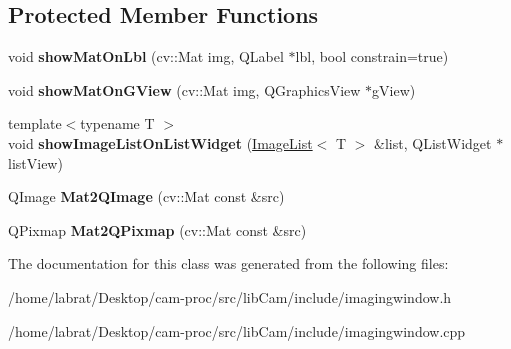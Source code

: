 \subsection*{Protected Member Functions}
\begin{DoxyCompactItemize}
\item 
void {\bfseries show\+Mat\+On\+Lbl} (cv\+::\+Mat img, Q\+Label $\ast$lbl, bool constrain=true)\hypertarget{classImagingWindow_ab563353010d3edd153300615836b3d17}{}\label{classImagingWindow_ab563353010d3edd153300615836b3d17}

\item 
void {\bfseries show\+Mat\+On\+G\+View} (cv\+::\+Mat img, Q\+Graphics\+View $\ast$g\+View)\hypertarget{classImagingWindow_aad9cc4bde1afac89025eabd312ea2552}{}\label{classImagingWindow_aad9cc4bde1afac89025eabd312ea2552}

\item 
{\footnotesize template$<$typename T $>$ }\\void {\bfseries show\+Image\+List\+On\+List\+Widget} (\hyperlink{classImageList}{Image\+List}$<$ T $>$ \&list, Q\+List\+Widget $\ast$list\+View)\hypertarget{classImagingWindow_a256a842ea3dbab9345ae8ec4d78e80bc}{}\label{classImagingWindow_a256a842ea3dbab9345ae8ec4d78e80bc}

\item 
Q\+Image {\bfseries Mat2\+Q\+Image} (cv\+::\+Mat const \&src)\hypertarget{classImagingWindow_acdc995ea9bc57acf8a3fd2ee246a5108}{}\label{classImagingWindow_acdc995ea9bc57acf8a3fd2ee246a5108}

\item 
Q\+Pixmap {\bfseries Mat2\+Q\+Pixmap} (cv\+::\+Mat const \&src)\hypertarget{classImagingWindow_a8cff4a00e84ccb08c3781a91e4160922}{}\label{classImagingWindow_a8cff4a00e84ccb08c3781a91e4160922}

\end{DoxyCompactItemize}


The documentation for this class was generated from the following files\+:\begin{DoxyCompactItemize}
\item 
/home/labrat/\+Desktop/cam-\/proc/src/lib\+Cam/include/imagingwindow.\+h\item 
/home/labrat/\+Desktop/cam-\/proc/src/lib\+Cam/include/imagingwindow.\+cpp\end{DoxyCompactItemize}
